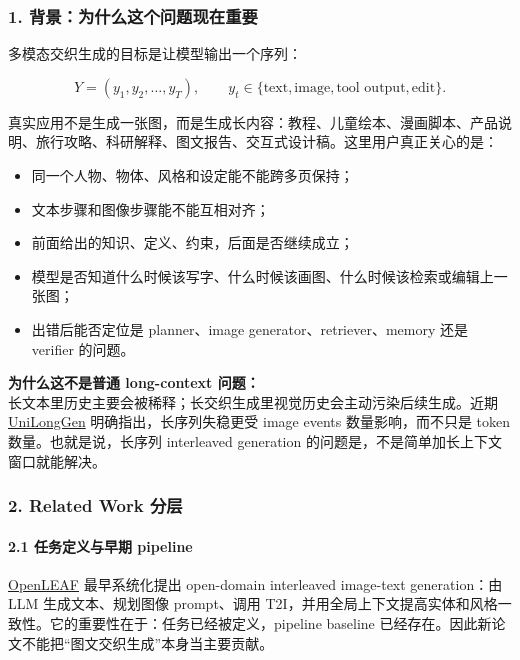 \subsubsection*{1. 背景：为什么这个问题现在重要}

多模态交织生成的目标是让模型输出一个序列：

\[
Y =
(y_1,y_2,\ldots,y_T),
\qquad
y_t \in \{\text{text},\text{image},\text{tool output},\text{edit}\}.
\]

真实应用不是生成一张图，而是生成长内容：教程、儿童绘本、漫画脚本、产品说明、旅行攻略、科研解释、图文报告、交互式设计稿。这里用户真正关心的是：

\begin{itemize}[leftmargin=1.5em]
  \item 同一个人物、物体、风格和设定能不能跨多页保持；
  \item 文本步骤和图像步骤能不能互相对齐；
  \item 前面给出的知识、定义、约束，后面是否继续成立；
  \item 模型是否知道什么时候该写字、什么时候该画图、什么时候该检索或编辑上一张图；
  \item 出错后能否定位是 planner、image generator、retriever、memory 还是 verifier 的问题。
\end{itemize}

\begin{warnbox}
\textbf{为什么这不是普通 long-context 问题：}\\
长文本里历史主要会被稀释；长交织生成里视觉历史会主动污染后续生成。近期 \href{https://arxiv.org/abs/2603.07540}{UniLongGen} 明确指出，长序列失稳更受 image events 数量影响，而不只是 token 数量。也就是说，长序列 interleaved generation 的问题是，不是简单加长上下文窗口就能解决。
\end{warnbox}

\subsubsection*{2. Related Work 分层}

\paragraph{2.1 任务定义与早期 pipeline}

\href{https://arxiv.org/abs/2310.07749}{OpenLEAF} 最早系统化提出 open-domain interleaved image-text generation：由 LLM 生成文本、规划图像 prompt、调用 T2I，并用全局上下文提高实体和风格一致性。它的重要性在于：任务已经被定义，pipeline baseline 已经存在。因此新论文不能把“图文交织生成”本身当主要贡献。

